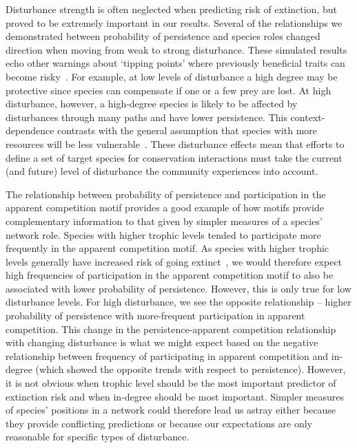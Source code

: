 \documentclass[12pt]{article}
\begin{document}
\begin{spacing}{2.0}
    Disturbance strength is often neglected when predicting risk of extinction, but proved to be extremely important in our results.
    Several of the relationships we demonstrated between probability of persistence and species roles changed direction when moving from weak to strong disturbance.
    These simulated results echo other warnings about `tipping points' where previously beneficial traits can become risky~\citep{Latty2019,Golubski2016,Tylianakis2014}.
    For example, at low levels of disturbance a high degree may be protective since species can compensate if one or a few prey are lost. 
    At high disturbance, however, a high-degree species is likely to be affected by disturbances through many paths and have lower persistence.
    This context-dependence contrasts with the general assumption that species with more resources will be less vulnerable~\citep{}.
    These disturbance effects mean that efforts to define a set of target species for conservation interactions must take the current (and future) level of disturbance the community experiences into account.
    

    The relationship between probability of persistence and participation in the apparent competition motif provides a good example of how motifs provide complementary information to that given by simpler measures of a species' network role.
    Species with higher trophic levels tended to participate more frequently in the apparent competition motif.
    As species with higher trophic levels generally have increased risk of going extinct~\citep{Eklof2013,others}, we would therefore expect high frequencies of participation in the apparent competition motif to also be associated with lower probability of persistence.
    However, this is only true for low disturbance levels. 
    For high disturbance, we see the opposite relationship – higher probability of persistence with more-frequent participation in apparent competition.
    This change in the persistence-apparent competition relationship with changing disturbance is what we might expect based on the negative relationship between frequency of participating in apparent competition and in-degree (which showed the opposite trends with respect to persistence).
    However, it is not obvious when trophic level should be the most important predictor of extinction risk and when in-degree should be most important.
    Simpler measures of species' positions in a network could therefore lead us astray either because they provide conflicting predictions or because our expectations are only reasonable for specific types of disturbance.



\end{spacing}
\end{document}
